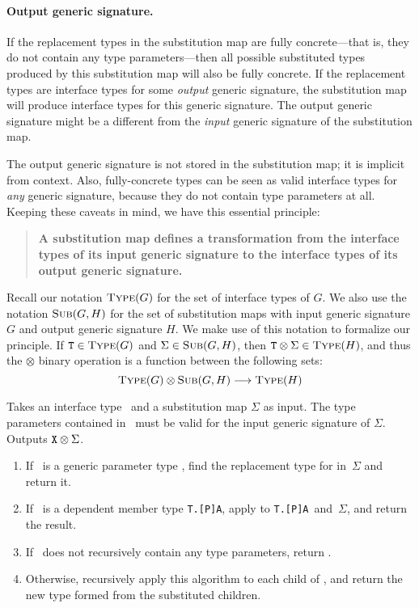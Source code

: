 \documentclass[../generics]{subfiles}
\begin{document}
\paragraph{Output generic signature.}
If the replacement types in the substitution map are fully concrete---that is, they do not contain any type parameters---then all possible substituted types produced by this substitution map will also be fully concrete. If the replacement types are interface types for some \emph{output} generic signature, the substitution map will produce interface types for this generic signature. The output generic signature might be a different from the \emph{input} generic signature of the substitution map. 

The output generic signature is not stored in the substitution map; it is implicit from context. Also, fully-concrete types can be seen as valid interface types for \emph{any} generic signature, because they do not contain type parameters at all. Keeping these caveats in mind, we have this essential principle:
\begin{quote}
\textbf{A substitution map defines a transformation from the interface types of its input generic signature to the interface types of its output generic signature.}
\end{quote}
Recall our notation $\textsc{Type}({G})$ for the set of interface types of $G$. We also use the notation $\textsc{Sub}({G, H})$ for the set of substitution maps with input generic signature $G$ and output generic signature $H$. We make use of this notation to formalize our principle. If $\texttt{T}\in\textsc{Type}({G})$ and $\Sigma\in\textsc{Sub}({G, H})$, then $\texttt{T}\otimes\Sigma\in\textsc{Type}({H})$, and thus the $\otimes$ binary operation is a function between the following sets:
\[\textsc{Type}({G})\otimes\textsc{Sub}({G, H})\longrightarrow\textsc{Type}({H})\]

\begin{algorithm}\label{type subst algo}
Takes an interface type \tX\ and a substitution map $\Sigma$ as input. The type parameters contained in \tX\ must be valid for the input generic signature of $\Sigma$. Outputs $\texttt{X}\otimes\Sigma$.
\begin{enumerate}
\item If \tX\ is a generic parameter type , find the replacement type for  in~$\Sigma$ and return it.
\item If \tX\ is a dependent member type \texttt{T.[P]A}, apply  to \texttt{T.[P]A}~and~$\Sigma$, and return the result.
\item If \tX\ does not recursively contain any type parameters, return \tX.
\item Otherwise, recursively apply this algorithm to each child of \tX, and return the new type formed from the substituted children.
\end{enumerate}
\end{algorithm}
\end{document}
